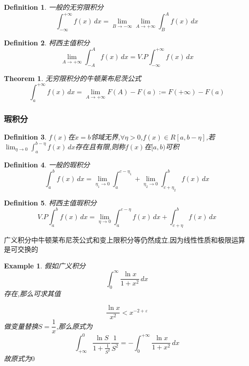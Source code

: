 \documentclass[11pt,hyperref,a4paper,UTF8]{ctexart}
\newtheorem{theorem}{Theorem}[subsection]
\newtheorem{example}{Example}[subsection]
\newtheorem{definition}{Definition}[subsection]
\begin{document}
\begin{CJK}{UTF8}{gkai}
\begin{definition}
  一般的无穷限积分\\
  \[\int_{-\infty}^{+\infty} f(x)\, dx = \lim_{B \to -\infty}\lim_{A \to +\infty} \int_{B}^{A}f(x)\, dx\]  
\end{definition}

\begin{definition}
  柯西主值积分\\
  \[\lim_{A \to +\infty} \int_{-A}^{A} f(x)\, dx = V.P \int_{-\infty}^{+\infty} f(x)\, dx\]
\end{definition}

\begin{theorem}
  无穷限积分的牛顿莱布尼茨公式\\
  \[\int_{a}^{+\infty} f(x)\, dx = \lim_{A\to +\infty} F(A) - F(a) := F(+\infty) - F(a) \]
\end{theorem}
\subsubsection{瑕积分}

\begin{definition}
  $f(x)$在$x = b$邻域无界,$\forall \eta > 0$,$f(x) \in R[a,b - \eta]$,若$\lim_{\eta \to 0}\int_{a}^{b - \eta} f(x)\, dx$存在且有限,则称$f(x)$在$[a,b)$可积
\end{definition}

\begin{definition}
  一般的瑕积分\\
  \[\int_{a}^{b} f(x)\, dx = \lim_{\eta_1 \to 0}\int_{a}^{c - \eta_1} + \lim_{\eta_2 \to 0} \int_{c + \eta_2}^{b}f(x)\, dx\]  
\end{definition}

\begin{definition}
  柯西主值瑕积分\\
  \[V.P \int_{a}^{b} f(x)\, dx = \lim_{\eta \to 0} \int_{a}^{c - \eta}f(x)\, dx + \int_{c + \eta}^{b} f(x)\, dx\]
\end{definition}

广义积分中牛顿莱布尼茨公式和变上限积分等仍然成立,因为线性性质和极限运算是可交换的

\begin{example}
  假如广义积分
  \[\int_{0}^{\infty}\dfrac{\ln x}{1 + x^2}\, dx\]
  存在,那么可求其值

  \[\dfrac{\ln x}{x^2} < x^{-2 + \varepsilon}\]
  做变量替换$S = \dfrac{1}{x}$,那么原式为
  \[\int_{+\infty}^{0}\dfrac{\ln S}{1 + \frac{1}{S^2}}\dfrac{1}{S^2} = - \int_{0}^{+\infty} \dfrac{\ln x}{1 + x^2}\, dx\]
  故原式为$0$
\end{example}


\end{CJK}
\end{document}
